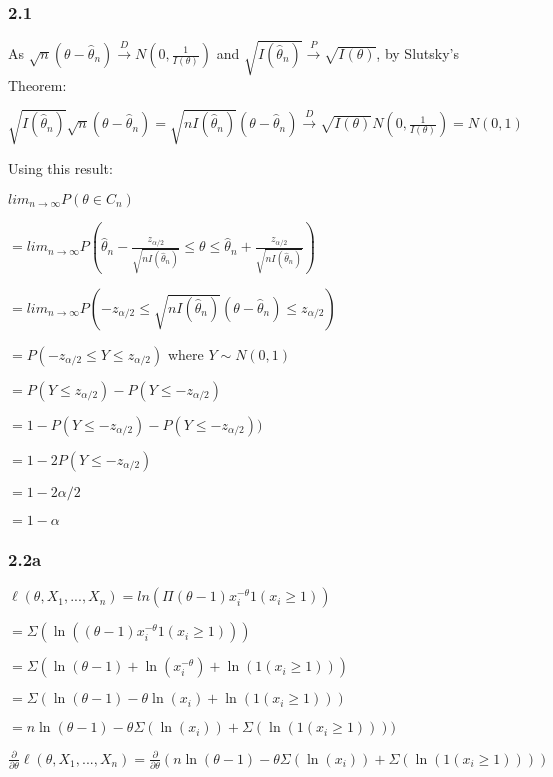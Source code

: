 \documentclass[
]{article}
\begin{document}
\hypertarget{section-6}{%
\subsubsection{2.1}\label{section-6}}

As
\(\sqrt{n}(\theta - \hat{\theta}_n) \overset{D}\rightarrow N(0, \frac{1}{I(\theta)})\)
and
\(\sqrt{I(\hat{\theta}_n)} \overset{P}\rightarrow \sqrt{I(\theta)}\), by
Slutsky's Theorem:

\(\sqrt{I(\hat{\theta}_n)}\sqrt{n}(\theta - \hat{\theta}_n) = \sqrt{nI(\hat{\theta}_n)}(\theta - \hat{\theta}_n) \overset{D}\rightarrow \sqrt{I(\theta)} N(0, \frac{1}{I(\theta)}) = N(0, 1)\)

Using this result:

\(lim_{n \rightarrow \infty} P(\theta \in C_n)\)

\(= lim_{n \rightarrow \infty} P(\hat{\theta}_n - \frac{z_{\alpha/2}}{\sqrt{nI(\hat{\theta}_n)}} \leq \theta \leq \hat{\theta}_n + \frac{z_{\alpha/2}}{\sqrt{nI(\hat{\theta}_n)}})\)

\(= lim_{n \rightarrow \infty} P(- z_{\alpha/2} \leq \sqrt{nI(\hat{\theta}_n)}(\theta - \hat{\theta}_n) \leq z_{\alpha/2})\)

\(= P(- z_{\alpha/2} \leq Y \leq z_{\alpha/2})\) where \(Y \sim N(0,1)\)

\(= P(Y \leq z_{\alpha/2}) - P(Y \leq -z_{\alpha/2})\)

\(= 1 - P(Y \leq -z_{\alpha/2}) - P(Y \leq -z_{\alpha/2}))\)

\(= 1 - 2P(Y \leq -z_{\alpha/2})\)

\(= 1 - 2\alpha/2\)

\(= 1 - \alpha\)

\hypertarget{a}{%
\subsubsection{2.2a}\label{a}}

\(\ell(\theta, X_1, ..., X_n) = ln(\Pi(\theta-1)x_i^{-\theta}1(x_i \geq 1))\)

\(= \Sigma(\ln((\theta-1)x_i^{-\theta}1(x_i \geq 1)))\)

\(= \Sigma(\ln(\theta-1) + \ln(x_i^{-\theta}) + \ln(1(x_i \geq 1)))\)

\(= \Sigma(\ln(\theta-1) - \theta \ln(x_i) + \ln(1(x_i \geq 1)))\)

\(= n \ln(\theta-1) - \theta \Sigma(\ln(x_i)) + \Sigma(\ln(1(x_i \geq 1))))\)

\(\frac{\partial}{\partial \theta} \ell(\theta, X_1, ..., X_n) = \frac{\partial}{\partial \theta} (n \ln(\theta-1) - \theta \Sigma(\ln(x_i)) + \Sigma(\ln(1(x_i \geq 1))))\)
\end{document}
